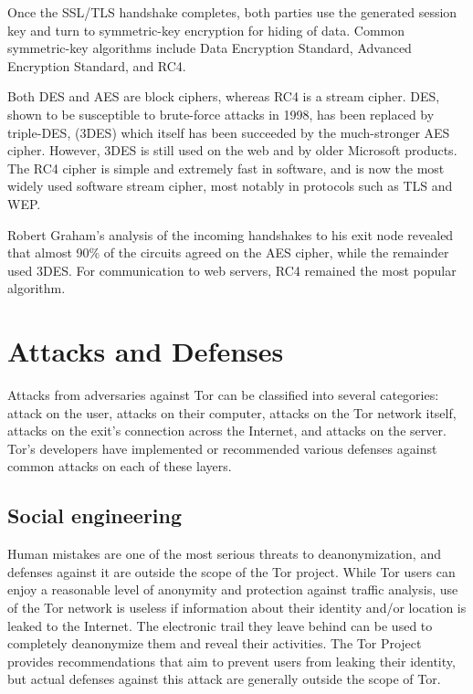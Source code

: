 \documentclass[journal]{IEEEtran}
\begin{document}
Once the SSL/TLS handshake completes, both parties use the generated session key and turn to symmetric-key encryption for hiding of data. Common symmetric-key algorithms include Data Encryption Standard, Advanced Encryption Standard, and RC4.

Both DES and AES are block ciphers, whereas RC4 is a stream cipher. DES, shown to be susceptible to brute-force attacks in 1998, has been replaced by triple-DES, (3DES) which itself has been succeeded by the much-stronger AES cipher. However, 3DES is still used on the web and by older Microsoft products.\cite{NIST2007}\cite{Bogdanov2011}\cite{Nikolic2009} The RC4 cipher is simple and extremely fast in software, and is now the most widely used software stream cipher, most notably in protocols such as TLS and WEP.

Robert Graham's analysis of the incoming handshakes to his exit node revealed that almost 90\% of the circuits agreed on the AES cipher, while the remainder used 3DES. For communication to web servers, RC4 remained the most popular algorithm.\cite{Graham2013}

\section{Attacks and Defenses}

Attacks from adversaries against Tor can be classified into several categories: attack on the user, attacks on their computer, attacks on the Tor network itself, attacks on the exit's connection across the Internet, and attacks on the server. Tor's developers have implemented or recommended various defenses against common attacks on each of these layers.

\subsection{Social engineering}

Human mistakes are one of the most serious threats to deanonymization, and defenses against it are outside the scope of the Tor project. While Tor users can enjoy a reasonable level of anonymity and protection against traffic analysis, use of the Tor network is useless if information about their identity and/or location is leaked to the Internet. The electronic trail they leave behind can be used to completely deanonymize them and reveal their activities. The Tor Project provides recommendations that aim to prevent users from leaking their identity, but actual defenses against this attack are generally outside the scope of Tor.
\end{document}
